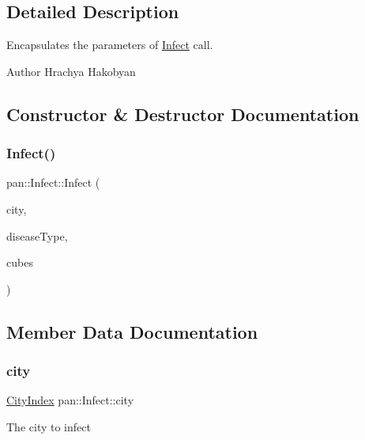 \subsection{Detailed Description}
Encapsulates the parameters of \hyperlink{classpan_1_1_infect}{Infect} call. 

\begin{DoxyAuthor}{Author}
Hrachya Hakobyan 
\end{DoxyAuthor}


\subsection{Constructor \& Destructor Documentation}
\mbox{\label{classpan_1_1_infect_ad6dfd4e6c39da420c65543f75c0e7d17}} 
\subsubsection{\texorpdfstring{Infect()}{Infect()}}
{\footnotesize\ttfamily pan\+::\+Infect\+::\+Infect (\begin{DoxyParamCaption}\item[{\hyperlink{namespacepan_afaed28aa6603153dcc062a028602d697}{City\+Index}}]{city,  }\item[{\hyperlink{namespacepan_a48851b51b0aef3f0e1be80df5031d9d7}{Disease\+Type}}]{disease\+Type,  }\item[{std\+::size\+\_\+t}]{cubes }\end{DoxyParamCaption})}



\subsection{Member Data Documentation}
\mbox{\label{classpan_1_1_infect_a33fc44ae32daff748b39b2c787f2fb42}} 
\subsubsection{\texorpdfstring{city}{city}}
{\footnotesize\ttfamily \hyperlink{namespacepan_afaed28aa6603153dcc062a028602d697}{City\+Index} pan\+::\+Infect\+::city}

The city to infect \mbox{\label{classpan_1_1_infect_a3ad54add7a5021ba5fed764f8e688378}} 
